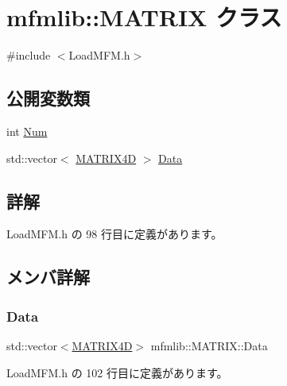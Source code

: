 \hypertarget{classmfmlib_1_1_m_a_t_r_i_x}{}\section{mfmlib\+:\+:M\+A\+T\+R\+IX クラス}
\label{classmfmlib_1_1_m_a_t_r_i_x}


{\ttfamily \#include $<$Load\+M\+F\+M.\+h$>$}

\subsection*{公開変数類}
\begin{DoxyCompactItemize}
\item 
int \mbox{\hyperlink{classmfmlib_1_1_m_a_t_r_i_x_a907c35d2fa39471508fb1fb6ce95ab04}{Num}}
\item 
std\+::vector$<$ \mbox{\hyperlink{structmfmlib_1_1_m_a_t_r_i_x4_d}{M\+A\+T\+R\+I\+X4D}} $>$ \mbox{\hyperlink{classmfmlib_1_1_m_a_t_r_i_x_abfb3b3bad3976f296250d669a302e5ee}{Data}}
\end{DoxyCompactItemize}


\subsection{詳解}


 Load\+M\+F\+M.\+h の 98 行目に定義があります。



\subsection{メンバ詳解}
\mbox{\label{classmfmlib_1_1_m_a_t_r_i_x_abfb3b3bad3976f296250d669a302e5ee}} 
\subsubsection{\texorpdfstring{Data}{Data}}
{\footnotesize\ttfamily std\+::vector$<$\mbox{\hyperlink{structmfmlib_1_1_m_a_t_r_i_x4_d}{M\+A\+T\+R\+I\+X4D}}$>$ mfmlib\+::\+M\+A\+T\+R\+I\+X\+::\+Data}



 Load\+M\+F\+M.\+h の 102 行目に定義があります。

\mbox{\label{classmfmlib_1_1_m_a_t_r_i_x_a907c35d2fa39471508fb1fb6ce95ab04}} 
